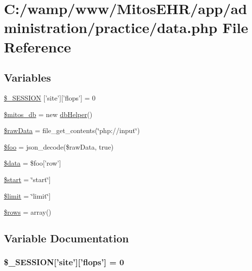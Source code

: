 \hypertarget{administration_2practice_2data_8php}{\section{\-C\-:/wamp/www/\-Mitos\-E\-H\-R/app/administration/practice/data.php \-File \-Reference}
\label{administration_2practice_2data_8php}
}
\subsection*{\-Variables}
\begin{DoxyCompactItemize}
\item 
\hyperlink{administration_2practice_2data_8php_a99fda8552a3e58235643b79f5af3ded8}{\$\-\_\-\-S\-E\-S\-S\-I\-O\-N} \mbox{[}'site'\mbox{]}\mbox{[}'flops'\mbox{]} = 0
\item 
\hyperlink{administration_2practice_2data_8php_ab5d961f93efe4e2e8d8374f01dd6c65a}{\$mitos\-\_\-db} = new \hyperlink{classdb_helper}{db\-Helper}()
\item 
\hyperlink{administration_2practice_2data_8php_ad66cfed6c1f454fbc3f3c6fdc8842a7b}{\$raw\-Data} = file\-\_\-get\-\_\-contents(\char`\"{}php\-://input\char`\"{})
\item 
\hyperlink{administration_2practice_2data_8php_a7a1efa8a0f6183fb3a5e8e8b0696526c}{\$foo} = json\-\_\-decode(\$raw\-Data, true)
\item 
\hyperlink{administration_2practice_2data_8php_a6efc15b5a2314dd4b5aaa556a375c6d6}{\$data} = \$foo\mbox{[}'row'\mbox{]}
\item 
\hyperlink{administration_2practice_2data_8php_a50a00e7de77365e00b117e73aa82fb9b}{\$start} = \char`\"{}start\char`\"{}\mbox{]}
\item 
\hyperlink{administration_2practice_2data_8php_ae05862a0294251c88629b141b5ce329a}{\$limit} = \char`\"{}limit\char`\"{}\mbox{]}
\item 
\hyperlink{administration_2practice_2data_8php_ace2ec39e7df3899fa8df9640ec274b03}{\$rows} = array()
\end{DoxyCompactItemize}


\subsection{\-Variable \-Documentation}
\hypertarget{administration_2practice_2data_8php_a99fda8552a3e58235643b79f5af3ded8}{
\subsubsection[{\$\-\_\-\-S\-E\-S\-S\-I\-O\-N}]{\setlength{\rightskip}{0pt plus 5cm}\$\-\_\-\-S\-E\-S\-S\-I\-O\-N\mbox{[}'site'\mbox{]}\mbox{[}'flops'\mbox{]} = 0}}\label{administration_2practice_2data_8php_a99fda8552a3e58235643b79f5af3ded8}


